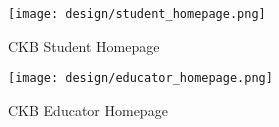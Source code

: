 \begin{figure} [H]
    \begin{center}
        \texttt{[image: design/student\_homepage.png]}
        \caption{CKB Student Homepage}
        \label{fig: student_homepage}
    \end{center}
\end{figure}

\begin{figure} [H]
    \begin{center}
        \texttt{[image: design/educator\_homepage.png]}
        \caption{CKB Educator Homepage}
        \label{fig: educator_homepage}
    \end{center}
\end{figure}

